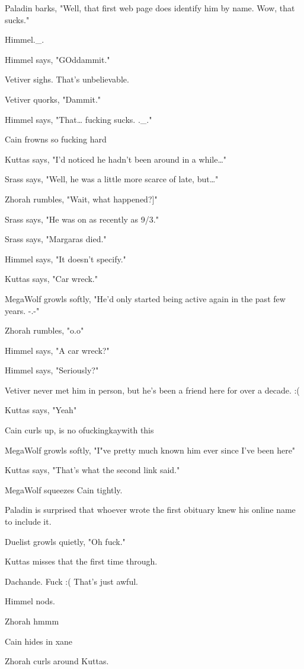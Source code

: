 \begin{hangparas}{2em}{1}
Paladin barks, "Well, that first web page does identify him by name. Wow, that sucks."

Himmel.\_.

Himmel says, "GOddammit."

Vetiver sighs. That's unbelievable.

Vetiver quorks, "Dammit."

Himmel says, "That\ldots{} fucking sucks. .\_."

Cain frowns so fucking hard

Kuttas says, "I'd noticed he hadn't been around in a while\ldots{}"

Srass says, "Well, he was a little more scarce of late, but\ldots{}"

Zhorah rumbles, "Wait, what happened?]"

Srass says, "He was on as recently as 9/3."

Srass says, "Margaras died."

Himmel says, "It doesn't specify."

Kuttas says, "Car wreck."

MegaWolf growls softly, "He'd only started being active again in the past few years. -.-"

Zhorah rumbles, "o.o"

Himmel says, "A car wreck?"

Himmel says, "Seriously?"

Vetiver never met him in person, but he's been a friend here for over a decade. :(

Kuttas says, "Yeah"

Cain curls up, is no ofuckingkaywith this

MegaWolf growls softly, "I"ve pretty much known him ever since I've been here"

Kuttas says, "That's what the second link said."

MegaWolf squeezes Cain tightly.

Paladin is surprised that whoever wrote the first obituary knew his online name to include it.

Duelist growls quietly, "Oh fuck."

Kuttas misses that the first time through.

Dachande. Fuck :( That's just awful.

Himmel nods.

Zhorah hmmm

Cain hides in xane

Zhorah curls around Kuttas.


\end{hangparas}
